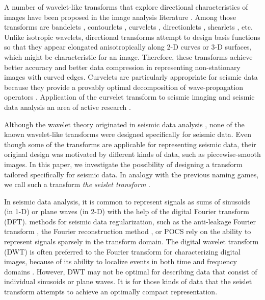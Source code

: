 A number of wavelet-like transforms that explore directional characteristics 
of images have been proposed in the image analysis literature \cite[]{beyond}. Among 
those transforms are bandelets \cite[]{bandelet}, %
contourlets \cite[]{contourlet}, curvelets \cite[]{curvelet}, directionlets 
\cite[]{directionlet}, shearlets \cite[]{shearlet}, etc. Unlike isotropic 
wavelets, di\-rec\-ti\-onal transforms attempt to design basis
functions so that they appear elongated anisotropically along 2-D
curves or 3-D surfaces, which might be characteristic for an
image. Therefore, these transforms achieve better accuracy and better
data compression in representing non-stationary images with curved
edges.  Curvelets are particularly appropriate for seismic data
because they provide {a} provably optimal decomposition of
wave-propagation operators \cite[]{candes}.  Application of the
curvelet transform to seismic imaging and seismic data analysis
  an area of active research
\cite[]{herrmann,douma,chauris,herrmann08}.

Although {the} wavelet theory originated in seismic data analysis
\cite[]{SEG-1981-S15.1}, none of the known wavelet-like transforms were 
designed specifically for seismic data. Even though some of the
transforms are applicable for representing seismic data, their
original design was motivated by different kinds of data, such as
piecewise-smooth images. In this paper, we investigate the possibility
{of designing} a transform tailored specifically
for seismic data. In analogy with the previous naming games, we call
such a transform \emph{the seislet transform} \cite[]{seislet}.

In seismic data analysis, it is common to represent signals as sums of
sinusoids (in 1-D) or plane waves (in 2-D) with the help of the
digital Fourier transform (DFT).  
methods for seismic data regularization, such as the anti-leakage
Fourier transform \cite[]{antileak}, the Fourier reconstruction method
\cite[]{frsi1,frsi2,frsi3}, {or POCS \cite[]{pocs}} rely on the ability to represent signals
sparsely in the transform domain. The digital wavelet transform (DWT)
is often preferred to the Fourier transform for characterizing digital
images, because of its ability to localize events in both time and
frequency domains \cite[]{ripples,mallat}.  However, DWT may not be
optimal for describing data that consist of individual sinusoids or
plane waves. It is for {those} kinds of data that the seislet
transform attempts to achieve an optimally compact representation.

